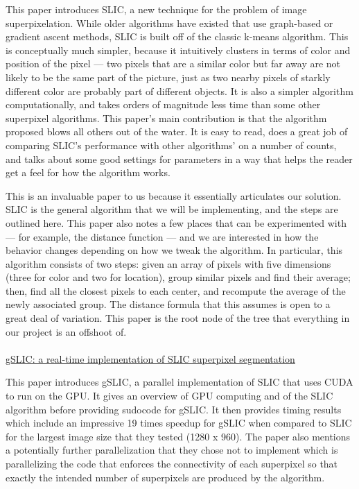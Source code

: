 \documentclass[11pt]{article}
\begin{document}
This paper introduces SLIC, a new technique for the problem of image superpixelation. While older algorithms have existed that use graph-based or gradient ascent methods, SLIC is built off of the classic k-means algorithm. This is conceptually much simpler, because it intuitively clusters in terms of color and position of the pixel --- two pixels that are a similar color but far away are not likely to be the same part of the picture, just as two nearby pixels of starkly different color are probably part of different objects. It is also a simpler algorithm computationally, and takes orders of magnitude less time than some other superpixel algorithms. This paper's main contribution is that the algorithm proposed blows all others out of the water. It is easy to read, does a great job of comparing SLIC's performance with other algorithms' on a number of counts, and talks about some good settings for parameters in a way that helps the reader get a feel for how the algorithm works.

This is an invaluable paper to us because it essentially articulates our solution. SLIC is the general algorithm that we will be implementing, and the steps are outlined here. This paper also notes a few places that can be experimented with --- for example, the distance function --- and we are interested in how the behavior changes depending on how we tweak the algorithm. In particular, this algorithm consists of two steps: given an array of pixels with five dimensions (three for color and two for location), group similar pixels and find their average; then, find all the closest pixels to each center, and recompute the average of the newly associated group. The distance formula that this assumes is open to a great deal of variation. This paper is the root node of the tree that everything in our project is an offshoot of.\\\\

\hyperlink{https://www.researchgate.net/publication/265890194}{gSLIC: a real-time implementation of SLIC superpixel segmentation} \cite{gslic}

This paper introduces gSLIC, a parallel implementation of SLIC that uses CUDA to run on the GPU. It gives an overview of GPU computing and of the SLIC algorithm before providing sudocode for gSLIC. It then provides timing results which include an impressive 19 times speedup for gSLIC when compared to SLIC for the largest image size that they tested (1280 x 960). The paper also mentions a potentially further parallelization that they chose not to implement which is parallelizing the code that enforces the connectivity of each superpixel so that exactly the intended number of superpixels are produced by the algorithm.
\end{document}
